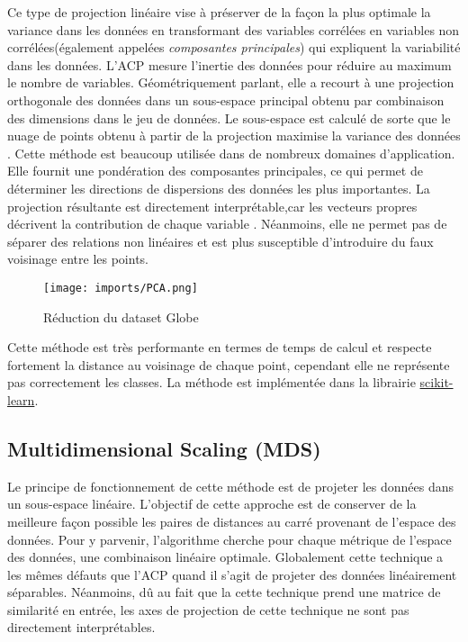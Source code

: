 Ce type de projection linéaire vise à préserver de la façon la plus optimale la variance dans les données en transformant des variables corrélées en variables non corrélées(également appelées \textit{composantes principales}) qui expliquent la variabilité dans les données. L’ACP mesure l’inertie des données pour réduire au maximum le nombre de variables. 
Géométriquement parlant, elle a recourt à une projection orthogonale des données dans un sous-espace principal obtenu par combinaison des dimensions dans le jeu de données. Le sous-espace est calculé de sorte que le nuage de points obtenu à partir de la projection maximise la variance des données \cite{HeulotThese}.\newline
Cette méthode est beaucoup utilisée dans de nombreux domaines d’application. Elle fournit une pondération des composantes principales, ce qui permet de déterminer les directions de dispersions des données les plus importantes.
La projection résultante est directement interprétable,car les vecteurs propres décrivent la contribution de chaque variable \cite{HeulotThese}.
Néanmoins, elle ne permet pas de séparer des relations non linéaires et est plus susceptible d’introduire du faux voisinage entre les points.

\begin{center}
    \begin{figure}[ht!]
        \centering
        
        \texttt{[image: imports/PCA.png]}
        
        \caption{Réduction du dataset Globe}
    \end{figure}
\end{center}

Cette méthode est très performante en termes de temps de calcul et respecte fortement la distance au voisinage de chaque point, cependant elle ne représente pas correctement les classes.
\smallskip
La méthode est implémentée dans la librairie \href{https://scikit-learn.org/stable/modules/generated/sklearn.decomposition.PCA.html}{scikit-learn}.

\subsection{Multidimensional Scaling (MDS)}

Le principe de fonctionnement de cette méthode est de projeter les données dans un sous-espace linéaire\cite{abdi2007-MDS}. L'objectif de cette approche est de conserver de la meilleure façon possible les paires de distances au carré provenant de l’espace des données. 
Pour y parvenir, l'algorithme cherche pour chaque métrique de l'espace des données, une combinaison linéaire optimale. Globalement cette technique a les mêmes défauts que l’ACP quand il s’agit de projeter des données linéairement séparables.
Néanmoins, dû au fait que la cette technique prend une matrice de similarité en entrée, les axes de projection de cette technique ne sont pas directement interprétables\cite{HeulotThese}.

